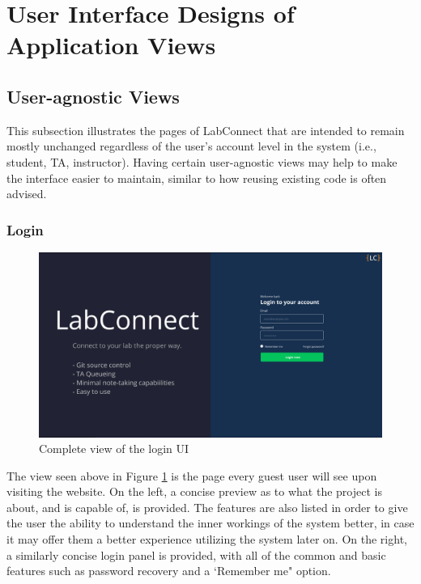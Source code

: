 \documentclass[a4paper, 12pt]{article}
\begin{document}
    
    
    
    
    
    
    
    \pagebreak
    
    \section{User Interface Designs of Application Views}
    
    \subsection{User-agnostic Views}
    
    This subsection illustrates the pages of LabConnect that are intended to remain mostly unchanged regardless of the user's account level in the system
    (i.e., student, TA, instructor). Having certain user-agnostic views may help to make the interface easier to maintain, similar to how
    reusing existing code is often advised.
    
    \subsubsection{Login}
    
    \begin{figure}[H]
        \centering
        \includegraphics[width=\textwidth]{login}
        \caption{Complete view of the login UI}
        \label{fig:login_full}
    \end{figure}
    
    The view seen above in Figure \ref{fig:login_full} is the page every guest user will see upon visiting the website.
    On the left, a concise preview as to what the project is about, and is capable of, is provided.
    The features are also listed in order to give the user the ability to understand the inner workings of the
    system better, in case it may offer them a better experience utilizing the system later on.
    On the right, a similarly concise login panel is provided, with all of the common and basic features
    such as password recovery and a `Remember me" option. 
    
\end{document}
